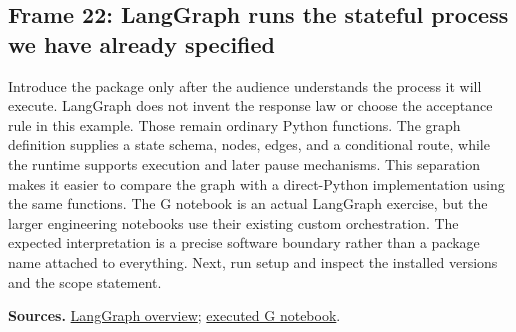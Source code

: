 \documentclass[11pt]{article}
\begin{document}
\subsection*{Frame 22: LangGraph runs the stateful process we have already specified}
Introduce the package only after the audience understands the process it will execute. LangGraph does not invent the response law or choose the acceptance rule in this example. Those remain ordinary Python functions. The graph definition supplies a state schema, nodes, edges, and a conditional route, while the runtime supports execution and later pause mechanisms. This separation makes it easier to compare the graph with a direct-Python implementation using the same functions. The G notebook is an actual LangGraph exercise, but the larger engineering notebooks use their existing custom orchestration. The expected interpretation is a precise software boundary rather than a package name attached to everything. Next, run setup and inspect the installed versions and the scope statement.\par
\par\nopagebreak\begin{minipage}{\linewidth}{\footnotesize\color{slate}\textbf{Sources.} \href{https://docs.langchain.com/oss/python/langgraph/overview}{LangGraph overview}; \href{../Graph_Workflow_Lab.ipynb}{executed G notebook}.\par}\end{minipage}\par\medskip
\end{document}
